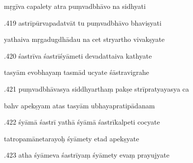 \documentclass[article,12pt,a4paper]{memoir}%
\newcounter{parCount}
\begin{document}
	  
	  \pstart \leavevmode%
	mṛgīva capalety atra puṃvadbhāvo na sidhyati 
	{}
	\pend%
      

	  
	  \pstart {}.419 astrīpūrvapadatvāt tu puṃvadbhāvo bhaviṣyati 
	{}
	\pend%
      

	  
	  \pstart \leavevmode%
	yathaiva mṛgadugdhādau na cet stryartho vivakṣyate 
	{}
	\pend%
      

	  
	  \pstart {}.420 śastrīva śastrīśyāmeti devadattaiva kathyate 
	{}
	\pend%
      

	  
	  \pstart \leavevmode%
	tasyām evobhayaṃ tasmād ucyate śāstravigrahe 
	{}
	\pend%
      

	  
	  \pstart {}.421 puṃvadbhāvasya siddhyarthaṃ pakṣe strīpratyayasya ca 
	{}
	\pend%
      

	  
	  \pstart \leavevmode%
	bahv apekṣyam atas tasyām ubhayapratipādanam 
	{}
	\pend%
      

	  
	  \pstart {}.422 śyāmā śastrī yathā śyāmā śastrīkalpeti cocyate 
	{}
	\pend%
      

	  
	  \pstart \leavevmode%
	tatropamānetarayoḥ śyāmety etad apekṣyate 
	{}
	\pend%
      

	  
	  \pstart {}.423 atha śyāmeva śastrīyaṃ śyāmety evaṃ prayujyate 
	{}
	\pend%
      
\end{document}
